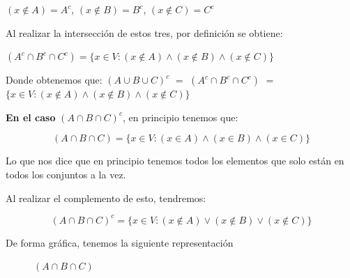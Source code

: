 \documentclass[10pt]{article}
\begin{document}
\begin{ej}
$(x \not\in A) = A^c$, $(x \not\in B) = B^c$, $(x \not\in C) = C^c$
 
 Al realizar la intersección de estos tres, por definición se obtiene: 
 
 $(A^c \cap B^c \cap C^c) = \{ x \in V : (x \not\in A) \land (x \not\in B) \land (x \not\in C) \}$
 
 Donde obtenemos que:
 \textcolor{B}{ $(A \cup B \cup C)^c$ $=$ $(A^c \cap B^c \cap C^c)$ $=$ $\{ x \in V : (x \not\in A) \land (x \not\in B) \land (x \not\in C) \}$}
 

\textbf{En el caso} $(A \cap B \cap C)^c$, en principio tenemos que:

$$(A \cap B \cap C) = \{ x \in V : (x \in A) \land (x \in B) \land (x \in C)\}$$

Lo que nos dice que en principio tenemos todos los elementos que solo están en todos los conjuntos a la vez. 

Al realizar el complemento de esto, tendremos:

$$(A \cap B \cap C)^c = \{ x \in V : (x \not\in A) \lor (x \not\in B) \lor (x \not\in C)\}$$

De forma gráfica, tenemos la siguiente representación
\begin{figure}[H]
	\begin{minipage}[b]{0.5\linewidth}
		\centering		

$(A \cap B \cap C)$
	\end{minipage}	 	
	\begin{minipage}[b]{0.5\linewidth}	
	\centering
\end{minipage}
\end{figure}
\end{ej}
\end{document}
